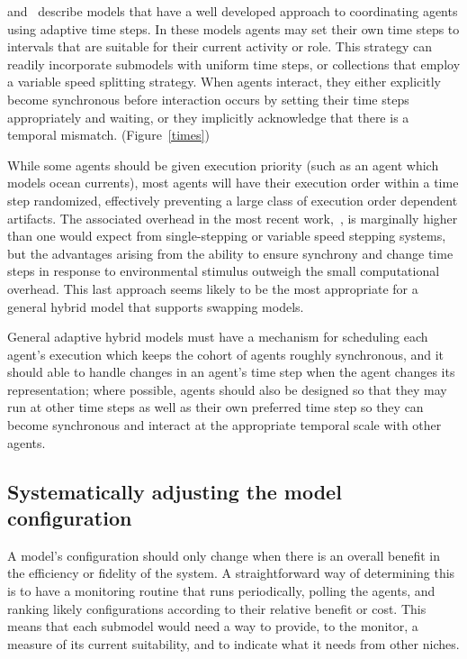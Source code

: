 \cite{gray2006nws} and~\cite{fulton2009crossingscales} describe models that have a well %
developed approach to coordinating agents using adaptive time
steps. In these models agents may set their own time steps to
intervals that are suitable for their current activity or role. This
strategy can readily incorporate sub\-models with uniform time steps, or
collections that employ a variable speed splitting strategy. When
agents interact, they either explicitly become synchronous before
interaction occurs by setting their time steps appropriately and
waiting, or they implicitly acknowledge that there is a temporal
mismatch. (Figure~\ref{times})

While some agents should be given execution priority (such as an agent
which models ocean currents), most agents will have their execution
order within a time step randomized, effectively preventing a large
class of execution order dependent artifacts.  The associated overhead
in the most recent work,~\cite{gray2006nws,gray2012adaptive}, is marginally higher
than one would expect from single-stepping or variable speed stepping
systems, but the advantages arising from the ability to ensure
synchrony and change time steps in response to en\-vi\-ron\-men\-tal stimulus
outweigh the small computational overhead.  This last approach seems
likely to be the most appropriate for a general hybrid model that
supports swapping models.

General adaptive hybrid models must have a mechanism for scheduling
each agent's execution which keeps the cohort of agents roughly
synchronous, and it should able to handle changes in an agent's time
step when the agent changes its rep\-re\-sen\-ta\-tion; where possible, agents
should also be designed so that they may run at other time steps as
well as their own preferred time step so they can become synchronous
and interact at the appropriate temporal scale with other agents.


\subsection{Systematically adjusting the model con\-fig\-ur\-a\-tion}

A model's con\-fig\-ur\-a\-tion should only change when there is an overall
benefit in the efficiency or fidelity of the system.  A
straightforward way of determining this is to have a monitoring
routine that runs periodically, polling the agents, and ranking likely
con\-fig\-ur\-a\-tions according to their relative benefit or cost.  This
means that each sub\-model would need a way to provide, to the monitor,
a measure of its current suitability, and to indicate what it needs
from other niches. 


